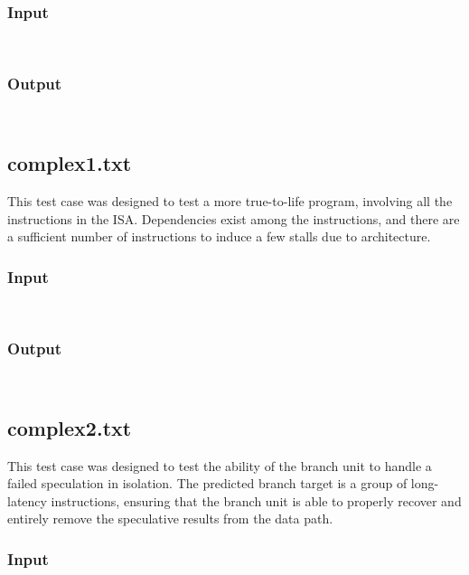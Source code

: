 \documentclass[12pt]{article}
\begin{document}
\subsubsection*{Input}
\begin{verbatim}
    
\end{verbatim}

\subsubsection*{Output}
\begin{verbatim}
    
\end{verbatim}

\subsection{complex1.txt}
This test case was designed to test a more true-to-life program, involving all the instructions in the ISA.  Dependencies exist among the instructions, and there are a sufficient number of instructions to induce a few stalls due to architecture.

\subsubsection*{Input}
\begin{verbatim}
    
\end{verbatim}

\subsubsection*{Output}
\begin{verbatim}
    
\end{verbatim}

\subsection{complex2.txt}
This test case was designed to test the ability of the branch unit to handle a failed speculation in isolation.  The predicted branch target is a group of long-latency instructions, ensuring that the branch unit is able to properly recover and entirely remove the speculative results from the data path.

\subsubsection*{Input}
\begin{verbatim}
    
\end{verbatim}
\end{document}
